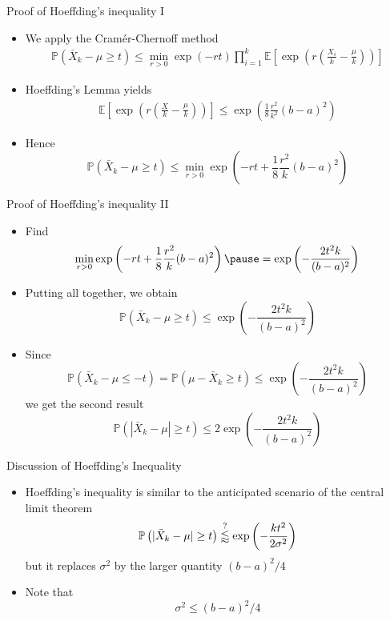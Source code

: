 \documentclass{beamer}
\newcommand{\bitem}{\item[$\bullet$]}
\begin{document}
\begin{frame}{Proof of Hoeffding's inequality I}

\begin{itemize}
    \bitem We apply the Cram\'er-Chernoff method
    \begin{equation*}
    \begin{aligned}
    \mathbb{P} \left(
    \bar{X}_k - \mu \geq t
    \right)
    \leq
    \min_{r>0}
    \exp(-rt)
    \prod_{i=1}^k
    \mathbb{E}
    \left[
    \exp\left(r\left(\frac{X_i}{k} - \frac{\mu}{k}\right)\right)
    \right]
    \end{aligned}
    \end{equation*}
    \bitem Hoeffding's Lemma yields
    \begin{equation*}
    \begin{aligned}
    \mathbb{E}
    \left[
    \exp\left(r\left(\frac{X}{k} - \frac{\mu}{k}\right)\right)
    \right]
    \leq
    \exp\left(
    \frac{1}{8}\frac{r^2}{k^2}(b-a)^2
    \right)
    \end{aligned}
    \end{equation*}
    \bitem Hence
    $$
    \mathbb{P} \left(
    \bar{X}_k - \mu \geq t
    \right)
    \leq 
    \min_{r>0}
    \exp\left(
    -rt +
    \frac{1}{8}\frac{r^2}{k}(b-a)^2
    \right)
    $$
\end{itemize}
\end{frame}

\begin{frame}{Proof of Hoeffding's inequality II}
\begin{itemize}
    \bitem Find
    $$
    \min_{r>0}\exp\left(
    -rt +
    \frac{1}{8}\frac{r^2}{k}(b-a)^2
    \right)
    \pause
    =
    \exp\left(
    -
    \frac{2t^2k}{(b-a)^2}
    \right)
    $$
    \bitem Putting all together, we obtain
    $$
    \mathbb{P} \left(
    \bar{X}_k - \mu \geq t
    \right)
    \leq 
    \exp\left(
    -
    \frac{2t^2k}{(b-a)^2}
    \right)
    $$
    \bitem Since
    $$
    \mathbb{P} \left(
    \bar{X}_k - \mu \leq -t
    \right)
    =
    \mathbb{P} \left(
    \mu - \bar{X}_k \geq t
    \right)
    \leq
    \exp\left(
    -
    \frac{2t^2k}{(b-a)^2}
    \right)
    $$
    we get the second result
    $$
    \mathbb{P} \left(
    |\bar{X}_k - \mu| \geq t
    \right)
    \leq 
    2
    \exp\left(
    -
    \frac{2t^2k}{(b-a)^2}
    \right)
    $$
\end{itemize}
\end{frame}


\begin{frame}{Discussion of Hoeffding's Inequality}

\begin{itemize}
    \bitem Hoeffding's inequality is similar to the anticipated scenario of the central limit theorem
    $$
    \mathbb{P} \left( |\bar{X}_k - \mu|\geq t \right)
    \overset{?}{\lessapprox}
    {\rm exp}
    \left(
    -\frac{k t^2}{2\sigma^2}
    \right)
    $$
    but it replaces $\sigma^2$ by the larger quantity $(b-a)^2/4$
    \bitem Note that
    $$
    \sigma^2 \leq (b-a)^2/4
    $$
\end{itemize}
    
\end{frame}
\end{document}

